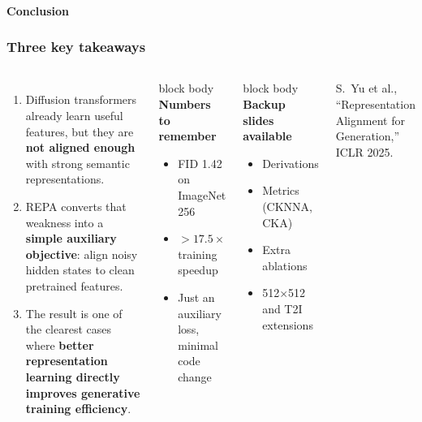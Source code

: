 \begin{frame}[t]
  \framesubtitle{Conclusion}
  \frametitle{Three key takeaways}
  \begin{columns}[T,totalwidth=\textwidth]
    \begin{enumerate}
      \item Diffusion transformers already learn useful features, but
            they are \textbf{not aligned enough} with strong semantic
            representations.
      \item REPA converts that weakness into a \textbf{simple auxiliary
            objective}: align noisy hidden states to clean pretrained
            features.
      \item The result is one of the clearest cases where \textbf{better
            representation learning directly improves generative
            training efficiency}.
    \end{enumerate}
    \vspace{0.18cm}
    \begin{beamercolorbox}[wd=\linewidth,rounded=true,sep=0.24cm]{block body}
      \textbf{Numbers to remember}
      \begin{itemize}
        \item FID 1.42 on ImageNet 256
        \item \(>17.5\times\) training speedup
        \item Just an auxiliary loss, minimal code change
      \end{itemize}
    \end{beamercolorbox}
    \vspace{0.24cm}
    \begin{beamercolorbox}[wd=\linewidth,rounded=true,sep=0.24cm]{block body}
      \textbf{Backup slides available}
      \begin{itemize}
        \item Derivations
        \item Metrics (CKNNA, CKA)
        \item Extra ablations
        \item 512\(\times\)512 and T2I extensions
      \end{itemize}
    \end{beamercolorbox}
    \vspace{0.24cm}
    {\small S.\ Yu et al., ``Representation Alignment for Generation,''
    ICLR 2025.}
  \end{columns}
\end{frame}
